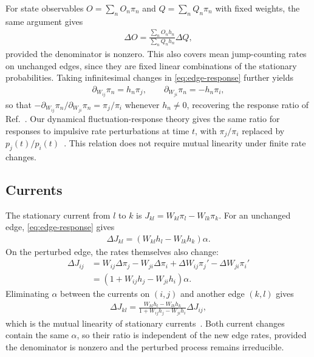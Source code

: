 \documentclass[
  reprint,
  superscriptaddress,
  amsmath,
  amssymb,
  aps,
  pre,
  longbibliography
]{revtex4-2}
\begin{document}
For state observables $O=\sum_n O_n\pi_n$ and
$Q=\sum_n Q_n\pi_n$ with fixed weights, the same argument gives
\begin{align}
    \Delta O=\frac{\sum_n O_n h_n}{\sum_n Q_n h_n}\Delta Q,
    \label{eq:observables}
\end{align}
provided the denominator is nonzero.
This also covers mean jump-counting rates on unchanged edges, since
they are fixed linear combinations of the stationary probabilities.
Taking infinitesimal changes in \cref{eq:edge-response} further yields
\begin{align}
    \partial_{W_{ij}}\pi_n=h_n\pi_j,\qquad
    \partial_{W_{ji}}\pi_n=-h_n\pi_i,
    \label{eq:derivatives}
\end{align}
so that $-\partial_{W_{ij}}\pi_n/\partial_{W_{ji}}\pi_n=\pi_j/\pi_i$
whenever $h_n\ne0$, recovering the response ratio of
Ref.~\cite{BebonSpeck2026}.
Our dynamical fluctuation-response theory gives the same ratio for
responses to impulsive rate perturbations at time $t$, with
$\pi_j/\pi_i$ replaced by $p_j(t)/p_i(t)$~\cite{AslyamovEsposito2026}.
This relation does not require mutual linearity under finite rate changes.

\subsection{Currents}

The stationary current from $l$ to $k$ is
$J_{kl}=W_{kl}\pi_l-W_{lk}\pi_k$.
For an unchanged edge, \cref{eq:edge-response} gives
\begin{align}
    \Delta J_{kl}=(W_{kl}h_l-W_{lk}h_k)\alpha.
    \label{eq:output-current}
\end{align}
On the perturbed edge, the rates themselves also change:
\begin{align}
    \Delta J_{ij}
    &=W_{ij}\Delta\pi_j-W_{ji}\Delta\pi_i
      +\Delta W_{ij}\pi_j'-\Delta W_{ji}\pi_i'
    \nonumber\\
    &=(1+W_{ij}h_j-W_{ji}h_i)\alpha.
    \label{eq:input-current}
\end{align}
Eliminating $\alpha$ between the currents on $(i,j)$ and another edge
$(k,l)$ gives
\begin{align}
    \Delta J_{kl}
    =\frac{W_{kl}h_l-W_{lk}h_k}
          {1+W_{ij}h_j-W_{ji}h_i}\Delta J_{ij},
    \label{eq:currents}
\end{align}
which is the mutual linearity of stationary
currents~\cite{Harunari2024,Khodabandehlou2025}.
Both current changes contain the same $\alpha$, so their ratio is
independent of the new edge rates, provided the denominator is nonzero
and the perturbed process remains irreducible.
\end{document}
